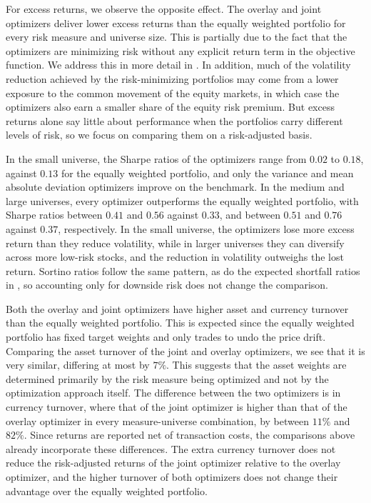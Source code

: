 For excess returns, we observe the opposite effect. The overlay and joint optimizers deliver lower excess returns than
the equally weighted portfolio for every risk measure and universe size. This is partially due to the fact that the optimizers are
minimizing risk without any explicit return term in the objective function. We address this in more detail in . 
In addition, much of the volatility reduction achieved by the risk-minimizing portfolios may come from a
lower exposure to the common movement of the equity markets, in which case the optimizers also earn a smaller share of the equity risk
premium. But excess returns alone say little about performance when the portfolios carry different levels of risk, so we focus on comparing them on a risk-adjusted basis.

In the small universe, the Sharpe ratios of the optimizers range from $0.02$ to $0.18$, against $0.13$ for the
equally weighted portfolio, and only the variance and mean absolute deviation optimizers improve on the benchmark. In
the medium and large universes, every optimizer outperforms the equally weighted portfolio, with Sharpe ratios between
$0.41$ and $0.56$ against $0.33$, and between $0.51$ and $0.76$ against $0.37$, respectively.
In the small universe, the optimizers lose more excess return than they reduce
volatility, while in larger universes they can diversify across more low-risk stocks,
and the reduction in volatility outweighs the lost return.
Sortino ratios follow the same pattern, as do the expected shortfall ratios in , so accounting only
for downside risk does not change the comparison. 

Both the overlay and joint optimizers have higher asset and currency turnover than the equally weighted portfolio. This is expected since the equally weighted portfolio has fixed target weights and only trades to undo the price drift.
Comparing the asset turnover of the joint and overlay optimizers, we see that it is very similar, differing at most by $7\%$. This suggests that the asset weights are determined primarily by the risk measure being optimized and not by the optimization approach itself. The difference between the two optimizers is in currency 
turnover, where that of the joint optimizer is higher than that of the overlay optimizer in every measure-universe combination, by 
between $11\%$ and $82\%$.  Since returns are reported net of transaction costs, the comparisons above already incorporate these differences. The extra currency turnover does not reduce the risk-adjusted returns of the joint optimizer relative to the overlay optimizer, and the higher turnover of both optimizers does not change their advantage over the equally weighted portfolio.

